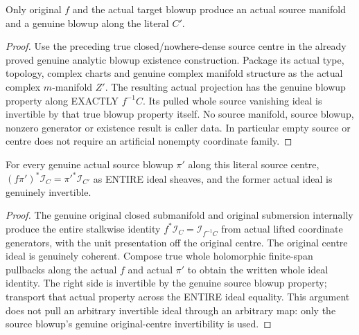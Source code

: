 \begin{theorem}
\label{hir:submersion-blowup-lift-existence}
\leanok
{}
Only original $f$ and the actual target blowup produce an actual source manifold and a genuine blowup along the literal $C'$.
\end{theorem}
\begin{proof}
Use the preceding true closed/nowhere-dense source centre in the already proved genuine analytic blowup existence construction. Package its actual type, topology, complex charts and genuine complex manifold structure as the actual complex $m$-manifold $Z'$. The resulting actual projection has the genuine blowup property along EXACTLY $f^{-1}C$. Its pulled whole source vanishing ideal is invertible by that true blowup property itself. No source manifold, source blowup, nonzero generator or existence result is caller data. In particular empty source or centre does not require an artificial nonempty coordinate family.
\end{proof}

\begin{theorem}
\label{hir:submersion-blowup-lift-whole-ideal}
\leanok
{}
For every genuine actual source blowup $\pi'$ along this literal source centre,
$(f\pi')^*\mathcal I_C=\pi'^*\mathcal I_{C'}$ as ENTIRE ideal sheaves, and the former actual ideal is genuinely invertible.
\end{theorem}
\begin{proof}
The genuine original closed submanifold and original submersion internally produce the entire stalkwise identity $f^*\mathcal I_C=\mathcal I_{f^{-1}C}$ from actual lifted coordinate generators, with the unit presentation off the original centre. The original centre ideal is genuinely coherent. Compose true whole holomorphic finite-span pullbacks along the actual $f$ and actual $\pi'$ to obtain the written whole ideal identity. The right side is invertible by the genuine source blowup property; transport that actual property across the ENTIRE ideal equality. This argument does not pull an arbitrary invertible ideal through an arbitrary map: only the source blowup's genuine original-centre invertibility is used.
\end{proof}

